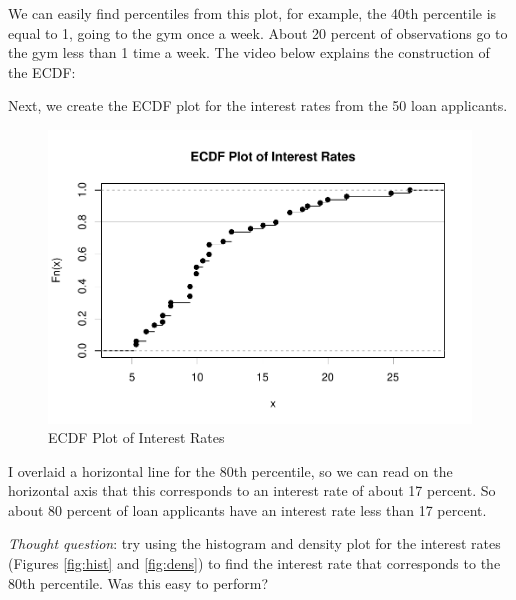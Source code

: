 \documentclass[
]{book}
\newenvironment{Shaded}{\begin{snugshade}}{\end{snugshade}}
\newcommand{\AttributeTok}[1]{\textcolor[rgb]{0.13,0.29,0.53}{#1}}
\newcommand{\FloatTok}[1]{\textcolor[rgb]{0.00,0.00,0.81}{#1}}
\newcommand{\FunctionTok}[1]{\textcolor[rgb]{0.13,0.29,0.53}{\textbf{#1}}}
\newcommand{\NormalTok}[1]{#1}
\newcommand{\SpecialCharTok}[1]{\textcolor[rgb]{0.81,0.36,0.00}{\textbf{#1}}}
\newcommand{\StringTok}[1]{\textcolor[rgb]{0.31,0.60,0.02}{#1}}
\begin{document}
We can easily find percentiles from this plot, for example, the 40th percentile is equal to 1, going to the gym once a week. About 20 percent of observations go to the gym less than 1 time a week. The video below explains the construction of the ECDF:

Next, we create the ECDF plot for the interest rates from the 50 loan applicants.

\begin{Shaded}
\end{Shaded}

\begin{figure}
\centering
\includegraphics{bookdown-demo_files/figure-latex/ecdfreal-1.pdf}
\caption{\label{fig:ecdfreal}ECDF Plot of Interest Rates}
\end{figure}

I overlaid a horizontal line for the 80th percentile, so we can read on the horizontal axis that this corresponds to an interest rate of about 17 percent. So about 80 percent of loan applicants have an interest rate less than 17 percent.

\emph{Thought question}: try using the histogram and density plot for the interest rates (Figures \ref{fig:hist} and \ref{fig:dens}) to find the interest rate that corresponds to the 80th percentile. Was this easy to perform?
\end{document}
